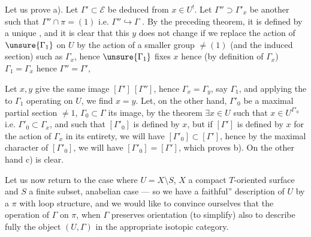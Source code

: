 
Let us prove a). Let \(\Gamma'\subset\mathcal E\) be
deduced from \(x\in U^!\).
Let \(\Gamma''\supset\Gamma'_x\) be another 
such that \(\Gamma''\cap\pi=(1)\) i.e. \(\Gamma''\hookrightarrow\Gamma\)
.
By the preceding theorem, it is defined by a unique
,
and it is clear that this \(y\) does not change if we replace the action of
\(\unsure{\Gamma_1}\) on \(U\) by the action of a smaller group
\(\ne(1)\) (and the induced section) such as \(\Gamma_x\),
hence \(\unsure{\Gamma_1}\)  fixes \(x\) hence
(by definition of \(\Gamma_x\)) \(\Gamma_1=\Gamma_x\) hence
\(\Gamma''=\Gamma'\), 

Let \(x,y\) give the same image
\([\Gamma']\ [\Gamma'']\), hence \(\Gamma_x=\Gamma_y\), say \(\Gamma_1\),
and applying the  to \(\Gamma_1\) operating on \(U\),
we find \(x=y\).
Let, on the other hand, \(\Gamma'_0\) be a maximal partial section \(\ne1\),
\(\Gamma_0\subset\Gamma\) its image,
by the theorem 
\(\exists x\in U\)  such that
\(x\in U^{\Gamma'_0}\) i.e. \(\Gamma'_0\subset\Gamma_x\),
and such that \([\Gamma'_0]\) is defined by \(x\),
but if \([\Gamma']\) is defined by \(x\) for the action of
\(\Gamma_x\) in its entirety, we will have \([\Gamma'_0]\subset[\Gamma']\),
hence by the maximal character of \([\Gamma'_0]\), we will have
\([\Gamma'_0]=[\Gamma']\), which  proves b).
On the other hand c) is clear.



Let us now return to the case where \(U=X\setminus S\), \(X\) a compact
\(T\)-oriented surface and \(S\) a finite
subset, anabelian case --- so we have a
 faithful'' description of \(U\) by a \(\pi\) with
loop structure, and we would like to convince ourselves
that  the  operation of \(\Gamma\)
on \(\pi\), when \(\Gamma\) preserves orientation (to simplify)
also  to describe fully the object
\((U,\Gamma)\) in the appropriate isotopic category.


